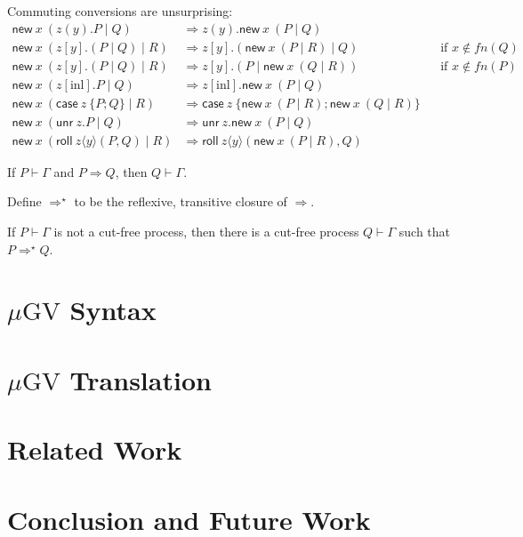 \documentclass[envcountsame]{llncs}
\newcommand{\tjud}[2]{#1 \vdash #2}
\newcommand{\mkwd}[1]{\mathsf{#1}}
\newcommand{\cut}[4]{\mkwd{new}\:#1 \: (#3 \mid #4)}
\newcommand{\unr}[1]{\mkwd{unr}\:#1}
\newcommand{\roll}[5]{\mkwd{roll}\:#1 \langle #2 \rangle (#4,#5)}
\newcommand{\clabel}[1]{\mathrm{#1}}
\renewcommand{\case}[2]{\mkwd{case}\:#1\:\{#2\}}
\newcommand{\sel}[2]{#1[\clabel{#2}]}
\newcommand{\mugv}{$\mu\mathrm{GV}$}
\begin{document}
Commuting conversions are unsurprising:
{\small\begin{align*}
  \cut{x}{A}{z(y).P}{Q} &\Longrightarrow z(y).\cut{x}{A}{P}{Q} \\
  \cut{x}{A}{z[y].(P \mid Q)}{R} &\Longrightarrow z[y].(\cut{x}{A}{P}{R} \mid Q) &&\text{if $x \not\in fn(Q)$} \\
  \cut{x}{A}{z[y].(P \mid Q)}{R} &\Longrightarrow z[y].(P \mid \cut{x}{A}{Q}{R}) &&\text{if $x \not\in fn(P)$} \\
  \cut{x}{A}{\sel{z}{inl}.P}{Q} &\Longrightarrow \sel{z}{inl}.\cut{x}{A}{P}{Q} \\
  \cut{x}{A}{\case{z}{P;Q}}{R} &\Longrightarrow \case{z}{\cut{x}{A}{P}{R}; \cut{x}{A}{Q}{R}} \\
  \cut{x}{A}{\unr{z}.P}{Q} &\Longrightarrow \unr{z}.\cut{x}{A}{P}{Q} \\
  \cut{x}{A}{\roll{z}{y}{B}{P}{Q}}{R} &\Longrightarrow \roll{z}{y}{B}{\cut{x}{A}{P}{R}}{Q}
\end{align*}}

\begin{theorem}
  If $\tjud{P}{\Gamma}$ and $P \Longrightarrow Q$, then $\tjud{Q}{\Gamma}.$
\end{theorem}

Define $\Longrightarrow^\star$ to be the reflexive, transitive closure of $\Longrightarrow$.

\begin{theorem}
  If $\tjud{P}{\Gamma}$ is not a cut-free process, then there is a cut-free process
  $\tjud{Q}{\Gamma}$ such that $P \Longrightarrow^\star Q$.
\end{theorem}

\section{\mugv{} Syntax}

\section{\mugv{} Translation}

\section{Related Work}

\section{Conclusion and Future Work}
\end{document}
